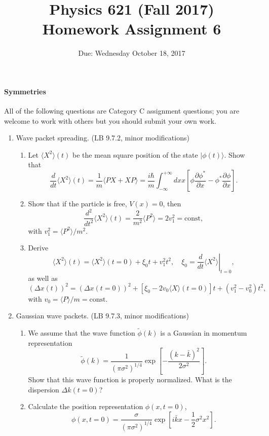 \documentclass[letterpaper,11pt]{article}
\title{Physics 621 (Fall 2017) \\ Homework Assignment 6}
\date{Due: Wednesday October 18, 2017}
\begin{document}
\maketitle

\paragraph*{Symmetries}

All of the following questions are Category C assignment questions; you are welcome to work with others but you should submit your own work.

\begin{enumerate}
  \item Wave packet spreading. (LB 9.7.2, minor modifications)
  \begin{enumerate}
    \item Let $\langle X^2 \rangle(t)$ be the mean square position of the state $|\phi(t)\rangle$. Show that
    $$ \frac{d}{dt} \langle X^2 \rangle(t) = \frac{1}{m} \langle PX + XP \rangle = \frac{i\hbar}{m} \int_{-\infty}^{+\infty} dx x \left[ \phi \frac{\partial \phi^*}{\partial x} - \phi^* \frac{\partial \phi}{\partial x} \right]. $$
    \item Show that if the particle is free, $V(x) = 0$, then
    $$ \frac{d^2}{dt^2} \langle X^2 \rangle(t) = \frac{2}{m^2} \langle P^2 \rangle = 2 v_1^2 = \mbox{const}, $$
    with $v_1^2 = \langle P^2 \rangle / m^2$.
    \item Derive
    $$ \langle X^2 \rangle(t) = \langle X^2 \rangle(t = 0) + \xi_0 t + v_1^2 t^2, \quad \xi_0 = \left. \frac{d}{dt} \langle X^2 \rangle\right|_{t = 0}, $$
    as well as
    $$ \left(\Delta x(t)\right)^2 = \left(\Delta x(t = 0)\right)^2 + \left[ \xi_0 - 2 v_0 \langle X \rangle (t = 0) \right] t + (v_1^2 - v_0^2) t^2, $$
    with $v_0 = \langle P \rangle / m = \mbox{const}$.
  \end{enumerate}
  \item Gaussian wave packets. (LB 9.7.3, minor modifications)
  \begin{enumerate}
    \item We assume that the wave function $\tilde\phi(k)$ is a Gaussian in momentum representation
    $$ \tilde\phi(k) = \frac{1}{(\pi \sigma^2)^{1/4}} \exp \left[ -\frac{(k-\bar{k})^2}{2 \sigma^2} \right]. $$
    Show that this wave function is properly normalized. What is the dispersion $\Delta k(t = 0)$?
    \item Calculate the position representation $\phi(x,t=0)$,
    $$ \phi(x,t = 0) = \frac{\sigma}{(\pi \sigma^2)^{1/4}} \exp \left[ i \bar{k} x - \frac{1}{2} \sigma^2 x^2 \right]. $$

\end{enumerate}
\end{enumerate}
\end{document}
